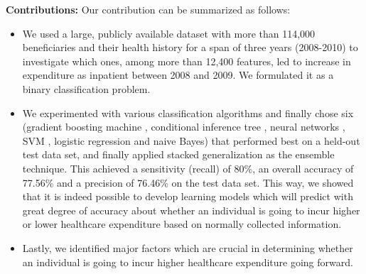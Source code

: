 {\bf Contributions:} Our contribution can be summarized as follows:
\begin{itemize}
\item We used a large, publicly available dataset with more than 114,000 beneficiaries and their health history for a span of three years (2008-2010) to investigate which ones, among more than 12,400 features, led to increase in expenditure as inpatient between 2008 and 2009. We formulated it as a binary classification problem. 
\item We experimented with various classification algorithms and finally chose six (gradient boosting machine \cite{Friedman01}, conditional inference tree \cite{HHZ06}, neural networks \cite{Ripley96}, SVM \cite{CV95}, logistic regression and naive Bayes) that performed best on a held-out test data set, and finally applied stacked generalization \cite{Wolpert92} as the ensemble technique. This achieved a sensitivity (recall) of 80\%, an overall accuracy of 77.56\% and a precision of 76.46\% on the test data set. This way, we showed that it is indeed possible to develop learning models which will predict with great degree of accuracy about whether an individual is going to incur higher or lower healthcare expenditure based on normally collected information.
\item Lastly, we identified major factors which are crucial in determining whether an individual is going to incur higher healthcare expenditure going forward. 
\end{itemize}

 
